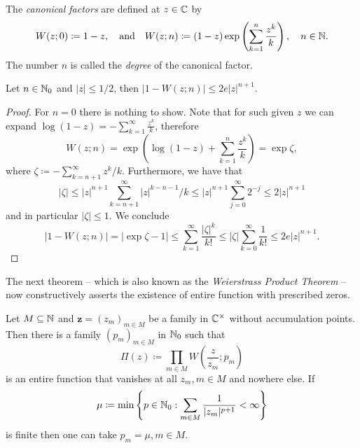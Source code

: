 \begin{definition} \label{def:canonical-factors}
    The \emph{canonical factors} are defined at $z \in \mathbb{C}$ by
    $$ W(z; 0) \coloneqq 1-z, \quad \textrm{and} \quad W(z; n) \coloneqq (1-z) \exp \left( \sum_{k=1}^n \frac{z^k}{k} \right), \quad n \in \mathbb{N}. $$
    The number $n$ is called the \emph{degree} of the canonical factor.
\end{definition}

\begin{lemma} \label{lem:estimate-canonical-factors}
    Let $n \in \mathbb{N}_0$ and $\vert z \vert \leq 1/2$, then $ \vert 1 - W(z; n) \vert \leq 2e \vert z \vert^{n+1} $.
\end{lemma}

\begin{proof}
    For $n = 0$ there is nothing to show. Note that for such given $z$ we can expand $\log (1 - z) = - \sum_{k=1}^\infty \frac{z^k}{k}$, therefore
    \begin{equation*}
        W(z; n) = \exp \left( \log(1-z) + \sum_{k=1}^n \frac{z^k}{k} \right) = \exp \zeta,
    \end{equation*}
    where $\zeta \coloneqq - \sum_{k=n+1}^\infty z^k / k$. Furthermore, we have that
    \begin{equation*}
        \vert \zeta \vert \leq \vert z \vert^{n+1} \sum_{k=n+1}^\infty \vert z \vert^{k-n-1} / k \leq \vert z \vert^{n+1} \sum_{j=0}^\infty 2^{-j} \leq 2 \vert z \vert^{n+1}
    \end{equation*}
    and in particular $\vert \zeta \vert \leq 1$. We conclude
    \begin{equation*}
        \vert 1 - W(z; n) \vert = \vert \exp \zeta - 1 \vert \leq \sum_{k=1}^\infty \frac{\vert \zeta \vert^k}{k!} \leq \vert \zeta \vert \sum_{k=0}^\infty \frac{1}{k!} \leq 2 e \vert z \vert^{n+1}.
    \end{equation*}
\end{proof}

The next theorem -- which is also known as the \emph{Weierstrass Product Theorem} -- now constructively asserts the existence of entire function with prescribed zeros.

\begin{theorem} \label{thm:function-with-prescribed-zeros}
    Let $M \subseteq \mathbb{N}$ and $\mathbf{z} = (z_m)_{m \in M}$ be a family in $\mathbb{C}^\times$ without accumulation points. Then there is a family $(p_m)_{m \in M}$ in $\mathbb{N}_0$ such that
    \begin{equation}
        \Pi(z) \coloneqq \prod_{m \in M} W\left(\frac{z}{z_m}; p_m\right)
    \end{equation}
    is an entire function that vanishes at all $z_m, m \in M$ and nowhere else. If
    \begin{equation}
        \mu \coloneqq \min \left\{ p \in \mathbb{N}_0 : \sum_{m \in M} \frac{1}{\vert z_m \vert^{p+1}} < \infty \right\}
    \end{equation}
    is finite then one can take $p_m = \mu, m \in M$.
\end{theorem}

